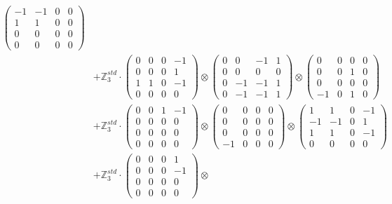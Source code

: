 \documentclass{article}
\begin{document}
{\begin{align}
            \begin{pmatrix} -1 & -1 & 0 & 0 \\ 1 & 1 & 0 & 0 \\ 0 & 0 & 0 & 0 \\ 0 & 0 & 0 & 0 \end{pmatrix} \\ 
        &+ \label{Rs16-Rc11-Solution-23-c25} \mathbb{Z}_3^{std} \cdot 
            \begin{pmatrix} 0 & 0 & 0 & -1 \\ 0 & 0 & 0 & 1 \\ 1 & 1 & 0 & -1 \\ 0 & 0 & 0 & 0 \end{pmatrix} \otimes 
            \begin{pmatrix} 0 & 0 & -1 & 1 \\ 0 & 0 & 0 & 0 \\ 0 & -1 & -1 & 1 \\ 0 & -1 & -1 & 1 \end{pmatrix} \otimes 
            \begin{pmatrix} 0 & 0 & 0 & 0 \\ 0 & 0 & 1 & 0 \\ 0 & 0 & 0 & 0 \\ -1 & 0 & 1 & 0 \end{pmatrix} \\ 
        &+ \label{Rs16-Rc11-Solution-23-c26} \mathbb{Z}_3^{std} \cdot 
            \begin{pmatrix} 0 & 0 & 1 & -1 \\ 0 & 0 & 0 & 0 \\ 0 & 0 & 0 & 0 \\ 0 & 0 & 0 & 0 \end{pmatrix} \otimes 
            \begin{pmatrix} 0 & 0 & 0 & 0 \\ 0 & 0 & 0 & 0 \\ 0 & 0 & 0 & 0 \\ -1 & 0 & 0 & 0 \end{pmatrix} \otimes 
            \begin{pmatrix} 1 & 1 & 0 & -1 \\ -1 & -1 & 0 & 1 \\ 1 & 1 & 0 & -1 \\ 0 & 0 & 0 & 0 \end{pmatrix} \\ 
        &+ \label{Rs16-Rc11-Solution-23-c27} \mathbb{Z}_3^{std} \cdot 
            \begin{pmatrix} 0 & 0 & 0 & 1 \\ 0 & 0 & 0 & -1 \\ 0 & 0 & 0 & 0 \\ 0 & 0 & 0 & 0 \end{pmatrix} \otimes 

\end{align}}
\end{document}
